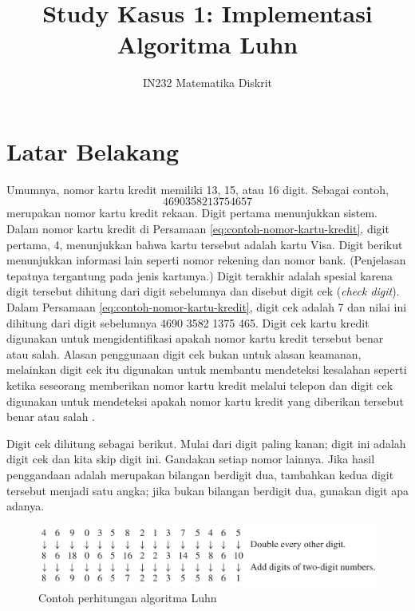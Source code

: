 \documentclass{article}
\title{Study Kasus 1: Implementasi Algoritma Luhn}
\author{IN232 Matematika Diskrit}
\date{}
\theoremstyle{plain}
\begin{document}
\maketitle

\section*{Latar Belakang}
Umumnya, nomor kartu kredit memiliki 13, 15, atau 16 digit. Sebagai contoh,
\begin{equation}
	4690 3582 1375 4657
	\label{eq:contoh-nomor-kartu-kredit}
\end{equation}
merupakan nomor kartu kredit rekaan. Digit pertama menunjukkan sistem. Dalam nomor kartu kredit di Persamaan \eqref{eq:contoh-nomor-kartu-kredit}, digit pertama, 4, menunjukkan bahwa kartu tersebut adalah kartu Visa. Digit berikut menunjukkan informasi lain seperti nomor rekening dan nomor bank. (Penjelasan tepatnya tergantung pada jenis kartunya.) Digit terakhir adalah spesial karena digit tersebut dihitung dari digit sebelumnya dan disebut digit cek (\textit{check digit}). Dalam Persamaan \eqref{eq:contoh-nomor-kartu-kredit}, digit cek adalah 7 dan nilai ini dihitung dari digit sebelumnya 4690 3582 1375 465. Digit cek kartu kredit digunakan untuk mengidentifikasi apakah nomor kartu kredit tersebut benar atau salah. Alasan penggunaan digit cek bukan untuk alasan keamanan, melainkan digit cek itu digunakan untuk membantu mendeteksi kesalahan seperti ketika seseorang memberikan nomor kartu kredit melalui telepon dan digit cek digunakan untuk mendeteksi apakah nomor kartu kredit yang diberikan tersebut benar atau salah \citep{johnsonbaugh2009discrete}.

Digit cek dihitung sebagai berikut. Mulai dari digit paling kanan; digit ini adalah digit cek dan kita skip digit ini. Gandakan setiap nomor lainnya. Jika hasil penggandaan adalah merupakan bilangan berdigit dua, tambahkan kedua digit tersebut menjadi satu angka; jika bukan bilangan berdigit dua, gunakan digit apa adanya.

\begin{figure}[!ht]
	\centering
	\includegraphics[scale=.25]{images/contoh-perhitungan-luhn}
	\caption{Contoh perhitungan algoritma Luhn}
	\label{fig:contoh-perhitungan-luhn}
\end{figure}
\end{document}
